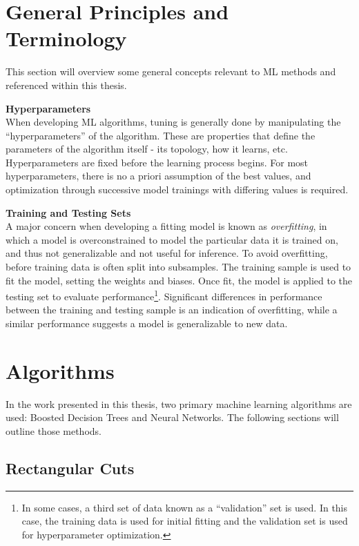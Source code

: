 \section{General Principles and Terminology}

This section will overview some general concepts relevant to \gls{ML} methods and referenced within this thesis.

\noindent\textbf{Hyperparameters}\\
\indent When developing \gls{ML} algorithms, tuning is generally done by manipulating the ``hyperparameters'' of the algorithm. These are properties that define the parameters of the algorithm itself - its topology, how it learns, etc. Hyperparameters are fixed before the learning process begins. For most hyperparameters, there is no a priori assumption of the best values, and optimization through successive model trainings with differing values is required.

\noindent\textbf{Training and Testing Sets}\\
\indent A major concern when developing a fitting model is known as \textit{overfitting}, in which a model is overconstrained to model the particular data it is trained on, and thus not generalizable and not useful for inference. To avoid overfitting, before training data is often split into subsamples. The training sample is used to fit the model, setting the weights and biases. Once fit, the model is applied to the testing set to evaluate performance\footnote{In some cases, a third set of data known as a ``validation'' set is used. In this case, the training data is used for initial fitting and the validation set is used for hyperparameter optimization.}. Significant differences in performance between the training and testing sample is an indication of overfitting, while a similar performance suggests a model is generalizable to new data.



\section{Algorithms}

In the work presented in this thesis, two primary machine learning algorithms are used: Boosted Decision Trees and Neural Networks. The following sections will outline those methods.

\subsection{Rectangular Cuts}

